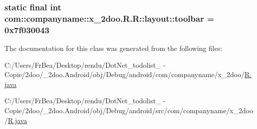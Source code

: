 \hypertarget{classcom_1_1companyname_1_1x__2doo_1_1_r_1_1layout_a2b0a3718b21516835f7859d7b9ee841}{
\subsubsection[{toolbar}]{\setlength{\rightskip}{0pt plus 5cm}static final int com::companyname::x\_\-2doo.R.R::layout::toolbar = 0x7f030043}}
\label{classcom_1_1companyname_1_1x__2doo_1_1_r_1_1layout_a2b0a3718b21516835f7859d7b9ee841}




The documentation for this class was generated from the following files:\begin{CompactItemize}
\item 
C:/Users/FrBea/Desktop/rendu/DotNet\_\-todolist\_ - Copie/2doo/\_\-2doo.Android/obj/Debug/android/com/companyname/x\_\-2doo/\hyperlink{com_2companyname_2x__2doo_2_r_8java}{R.java}\item 
C:/Users/FrBea/Desktop/rendu/DotNet\_\-todolist\_ - Copie/2doo/\_\-2doo.Android/obj/Debug/android/src/com/companyname/x\_\-2doo/\hyperlink{src_2com_2companyname_2x__2doo_2_r_8java}{R.java}\end{CompactItemize}
